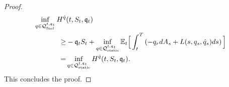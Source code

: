 \documentclass[10pt,a4paper]{article}
\begin{document}
\begin{proof}
		\begin{equation*}
		\begin{split}
		\inf_{q\in \mathcal{Q}_{\text{fuel}}^{t,\mathfrak{q}_t}}
		H^{\dot{q}} &(t,S_t,\mathfrak{q}_t)\\
		\geq &
		-\mathfrak{q}_t S_t
		+ \inf_{q \in \mathcal{Q}_{\text{static}}^{t,\mathfrak{q}_t}}
		\mathbb{{E}}_t \Big[
		\int_{t}^{T} \left(-q_r dA_s + L(s,q_s,\dot{q}_s)ds \right)
		\Big]\\
		=&
		\inf_{q \in \mathcal{Q}_{\text{static}}^{t,\mathfrak{q}_t}}
		H^{\dot{q}} (t,S_t,\mathfrak{q}_t).
		\end{split}
		\end{equation*}
		This concludes the proof. 
	\end{proof}
\end{document}
